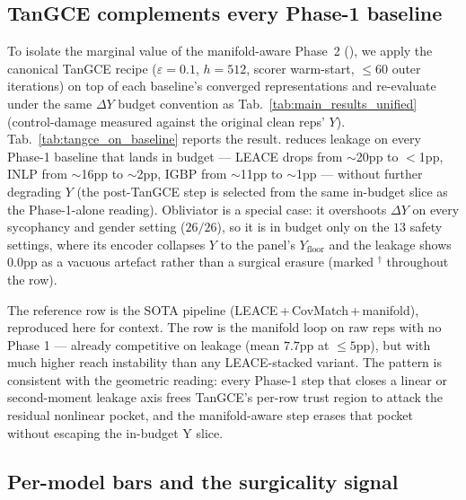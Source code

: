 \subsection{TanGCE complements every Phase-1 baseline}
\label{sec:tangce_on_baseline}

To isolate the marginal value of the manifold-aware Phase~2 (\TanGCE{}), we apply the canonical TanGCE recipe ($\varepsilon{=}0.1$, $h{=}512$, scorer warm-start, $\le 60$ outer iterations) on top of each baseline's converged representations and re-evaluate under the same $\Delta Y$ budget convention as Tab.~\ref{tab:main_results_unified} (control-damage measured against the original clean reps' $Y$). Tab.~\ref{tab:tangce_on_baseline} reports the result. \TanGCE{} reduces leakage on every Phase-1 baseline that lands in budget --- LEACE drops from $\sim$20pp to $<$1pp, INLP from $\sim$16pp to $\sim$2pp, IGBP from $\sim$11pp to $\sim$1pp --- without further degrading $Y$ (the post-TanGCE step is selected from the same in-budget slice as the Phase-1-alone reading). Obliviator is a special case: it overshoots $\Delta Y$ on every sycophancy and gender setting ($26/26$), so it is in budget only on the $13$ safety settings, where its encoder collapses $Y$ to the panel's $Y_{\text{floor}}$ and the leakage shows $0.0$pp as a vacuous artefact rather than a surgical erasure (marked $^\dagger$ throughout the row).



The \TanGCEpp{} reference row is the SOTA pipeline (LEACE\,+\,CovMatch\,+\,manifold), reproduced here for context. The \TanGCE{} row is the manifold loop on raw reps with no Phase 1 --- already competitive on leakage (mean $7.7$pp at $\le 5$pp), but with much higher reach instability than any LEACE-stacked variant. The pattern is consistent with the geometric reading: every Phase-1 step that closes a linear or second-moment leakage axis frees TanGCE's per-row trust region to attack the residual nonlinear pocket, and the manifold-aware step erases that pocket without escaping the in-budget Y slice.

\subsection{Per-model bars and the surgicality signal}
\label{sec:pareto_obliviator}

